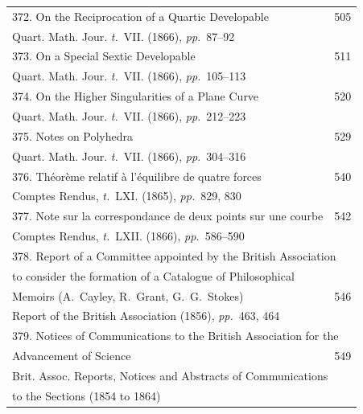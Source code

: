 \documentclass[11pt,a4paper]{article}
\newcommand{\tome}{\textit{t.}}
\newcommand{\pages}{\textit{pp.}}
\begin{document}
\begin{longtable}{p{4.5in}r}
372. On the Reciprocation of a Quartic Developable & 505 \\[-0.3em]
\multicolumn{2}{l}{\quad\small Quart. Math. Jour. \tome~VII. (1866), \pages~87--92} \\[0.5em]

373. On a Special Sextic Developable & 511 \\[-0.3em]
\multicolumn{2}{l}{\quad\small Quart. Math. Jour. \tome~VII. (1866), \pages~105--113} \\[0.5em]

374. On the Higher Singularities of a Plane Curve & 520 \\[-0.3em]
\multicolumn{2}{l}{\quad\small Quart. Math. Jour. \tome~VII. (1866), \pages~212--223} \\[0.5em]

375. Notes on Polyhedra & 529 \\[-0.3em]
\multicolumn{2}{l}{\quad\small Quart. Math. Jour. \tome~VII. (1866), \pages~304--316} \\[0.5em]

376. Th\'{e}or\`{e}me relatif \`{a} l'\'{e}quilibre de quatre forces & 540 \\[-0.3em]
\multicolumn{2}{l}{\quad\small Comptes Rendus, \tome~LXI. (1865), \pages~829, 830} \\[0.5em]

377. Note sur la correspondance de deux points sur une courbe & 542 \\[-0.3em]
\multicolumn{2}{l}{\quad\small Comptes Rendus, \tome~LXII. (1866), \pages~586--590} \\[0.5em]

\multicolumn{2}{l}{378. Report of a Committee appointed by the British Association} \\[-0.3em]
\multicolumn{2}{l}{\quad\small to consider the formation of a Catalogue of Philosophical} \\[-0.3em]
\quad Memoirs (A.~Cayley, R.~Grant, G.~G.~Stokes) & 546 \\[-0.3em]
\multicolumn{2}{l}{\quad\small Report of the British Association (1856), \pages~463, 464} \\[0.5em]

\multicolumn{2}{l}{379. Notices of Communications to the British Association for the} \\[-0.3em]
\quad Advancement of Science & 549 \\[-0.3em]
\multicolumn{2}{l}{\quad\small Brit. Assoc. Reports, Notices and Abstracts of Communications} \\[-0.3em]
\multicolumn{2}{l}{\quad\small to the Sections (1854 to 1864)} \\[0.5em]


\end{longtable}
\end{document}
